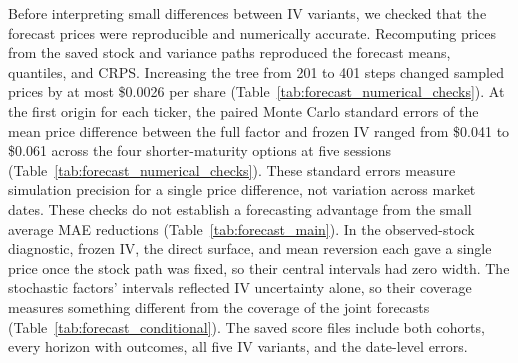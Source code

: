 \begin{table}[H]
\centering
\caption{Five-session option errors under mean and median point forecasts for the shorter-maturity cohort. Mean MAE and Mean RMSE score the simulated mean, and Median MAE scores the median. The prespecified comparison scores the mean, and the median is an added summary. All errors are in dollars per share and use the same date-weighted options as Table~\ref{tab:forecast_main}.}\label{tab:option_point_summary}

\end{table}

Before interpreting small differences between IV variants, we checked that the forecast prices were reproducible and numerically accurate. Recomputing prices from the saved stock and variance paths reproduced the forecast means, quantiles, and CRPS. Increasing the tree from 201 to 401 steps changed sampled prices by at most \$0.0026 per share (Table~\ref{tab:forecast_numerical_checks}). At the first origin for each ticker, the paired Monte Carlo standard errors of the mean price difference between the full factor and frozen IV ranged from \$0.041 to \$0.061 across the four shorter-maturity options at five sessions (Table~\ref{tab:forecast_numerical_checks}). These standard errors measure simulation precision for a single price difference, not variation across market dates. These checks do not establish a forecasting advantage from the small average MAE reductions (Table~\ref{tab:forecast_main}). In the observed-stock diagnostic, frozen IV, the direct surface, and mean reversion each gave a single price once the stock path was fixed, so their central intervals had zero width. The stochastic factors' intervals reflected IV uncertainty alone, so their coverage measures something different from the coverage of the joint forecasts (Table~\ref{tab:forecast_conditional}). The saved score files include both cohorts, every horizon with outcomes, all five IV variants, and the date-level errors.

\begin{table}[H]
\centering
\caption{Numerical checks of the forecast prices at the first origin, August 4, 2026. Sampled prices repeat the tree calculation with 201 and 401 steps for both cohorts, all five IV variants, calls and puts, and the first ten paths. Price changes and standard errors are in dollars per share. Paired Monte Carlo SE is the standard error of the mean price difference between the full factor and frozen IV across 1{,}000 paths. It applies to the shorter-maturity options at the five-session endpoint.}\label{tab:forecast_numerical_checks}

\end{table}

